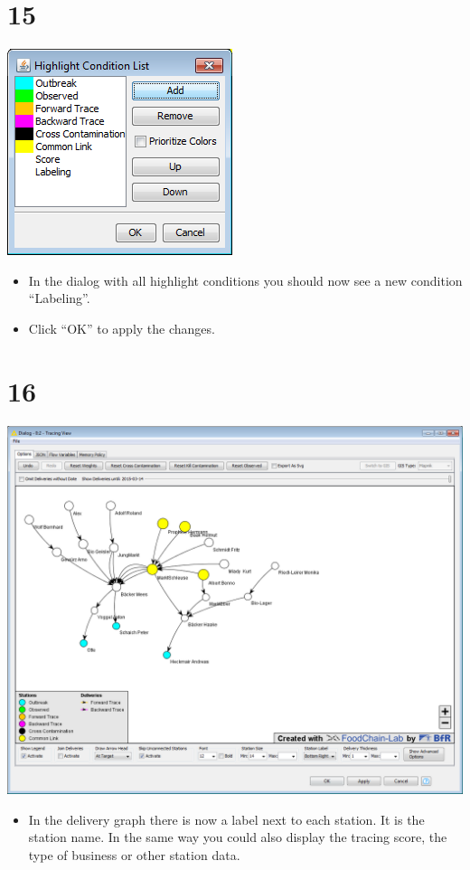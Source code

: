 \documentclass[10pt]{beamer}
\begin{document}
\section{15}
\begin{frame}
	\begin{center}
  		\includegraphics[scale=0.6]{15.png}
	\end{center}
	\begin{itemize}
		\item In the dialog with all highlight conditions you should now see a new condition ``Labeling''.
		\item Click ``OK'' to apply the changes.
	\end{itemize}
\end{frame}

\section{16}
\begin{frame}
	\begin{center}
  		\includegraphics[height=0.6\textheight]{16.png}
	\end{center}
	\begin{itemize}
		\item In the delivery graph there is now a label next to each station. It is the station name. In the same way you could also display the tracing score, the type of business or other station data.
	\end{itemize}
\end{frame}
\end{document}
